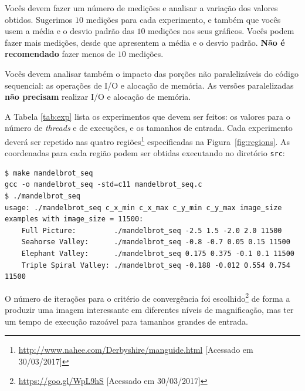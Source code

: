 \documentclass[final,12pt,a4paper]{elsarticle}
\begin{document}
Vocês devem fazer um número de medições e analisar a variação dos valores
obtidos.  Sugerimos $10$ medições para cada experimento, e também que vocês
usem a média e o desvio padrão das $10$ medições nos seus gráficos. Vocês podem
fazer mais medições, desde que apresentem a média e o desvio padrão.
\textbf{Não é recomendado} fazer menos de $10$ medições.

Vocês devem analisar também o impacto das porções não paralelizáveis do
código sequencial: as operações de I/O e alocação de memória. As versões
paralelizadas \textbf{não precisam} realizar I/O e alocação de memória.

A Tabela \ref{tab:exp} lista os experimentos que devem ser feitos: os valores
para o número de \textit{threads} e de execuções, e os tamanhos de entrada.
Cada experimento deverá ser repetido nas quatro
regiões\footnote{\url{http://www.nahee.com/Derbyshire/manguide.html} [Acessado
em 30/03/2017]} especificadas na Figura~\ref{fig:regions}. As coordenadas para
cada região podem ser obtidas executando no diretório \texttt{src}:

\begin{lstlisting}
$ make mandelbrot_seq
gcc -o mandelbrot_seq -std=c11 mandelbrot_seq.c
$ ./mandelbrot_seq
usage: ./mandelbrot_seq c_x_min c_x_max c_y_min c_y_max image_size
examples with image_size = 11500:
    Full Picture:         ./mandelbrot_seq -2.5 1.5 -2.0 2.0 11500
    Seahorse Valley:      ./mandelbrot_seq -0.8 -0.7 0.05 0.15 11500
    Elephant Valley:      ./mandelbrot_seq 0.175 0.375 -0.1 0.1 11500
    Triple Spiral Valley: ./mandelbrot_seq -0.188 -0.012 0.554 0.754 11500
\end{lstlisting}

O número de iterações para o critério de convergência foi
escolhido\footnote{\url{https://goo.gl/WpL9hS} [Acessado em 30/03/2017]} de
forma a produzir uma imagem interessante em diferentes níveis de magnificação,
mas ter um tempo de execução razoável para tamanhos grandes de entrada.
\end{document}

